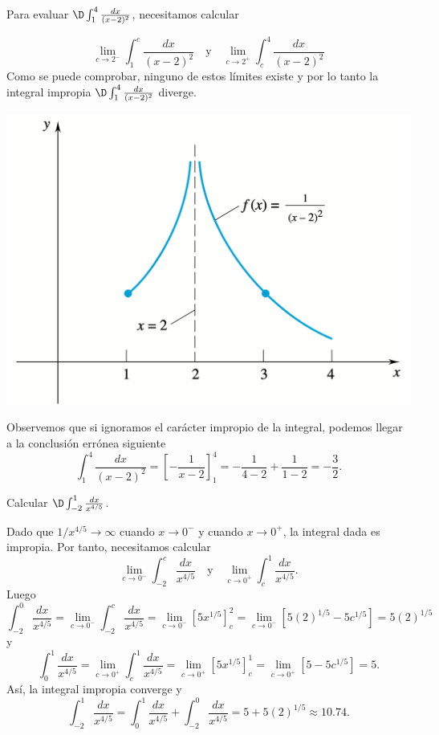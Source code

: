 \begin{example}
  Para evaluar
$\D\int_{1}^{4} \frac{dx}{(x-2)^2}$, 
necesitamos calcular

\noindent
\begin{minipage}{.6\textwidth}
  \[\lim_{c \to 2^{-}} \int_{1}^{c} \frac{dx}{(x-2)^2} \quad \text{y} \quad \lim_{c \to 2^{+}} \int_{c}^{4} \frac{dx}{(x-2)^2}\]
Como se puede comprobar, ninguno de estos límites existe y por lo tanto la integral impropia $\D\int_{1}^{4} \frac{dx}{(x-2)^2}$ diverge.
    
\end{minipage}
\begin{minipage}{.39\textwidth}
  \begin{center}
    \includegraphics[width=.9\textwidth]{pics/integral-impropia-discontinuidad-doble.png}
  \end{center}
\end{minipage}

Observemos que si ignoramos el carácter impropio de la integral, podemos llegar a la conclusión errónea siguiente
\[\int_{1}^{4} \frac{dx}{(x-2)^2} = \left[-\frac{1}{x-2}\right]_{1}^{4} =
-\frac{1}{4-2} +\frac{1}{1-2}=  -\frac{3}{2}.\]
\end{example}

\begin{example}
Calcular $\D\int_{-2}^{1} \frac{dx}{x^{4/5}}$.

Dado que $1/x^{4/5} \to \infty$ cuando $x \to 0^{-}$ y cuando $x \to 0^{+}$, la integral dada es impropia. Por tanto, necesitamos calcular
\[\lim_{c \to 0^{-}} \int_{-2}^{c} \frac{dx}{x^{4/5}} \quad \text{y} \quad \lim_{c \to 0^{+}} \int_{c}^{1} \frac{dx}{x^{4/5}}.\]
Luego
\[\int_{-2}^{0} \frac{dx}{x^{4/5}} = \lim_{c \to 0^{-}} \int_{-2}^{c} \frac{dx}{x^{4/5}} = \lim_{c \to 0^{-}} \left[5x^{1/5}\right]_{c}^{2} = \lim_{c \to 0^{-}} \left[5(2)^{1/5} - 5c^{1/5}\right] = 5(2)^{1/5}\]
y
\[
\int_{0}^{1} \frac{dx}{x^{4/5}} = \lim_{c \to 0^{+}} \int_{c}^{1} \frac{dx}{x^{4/5}} = \lim_{c \to 0^{+}} \left[5x^{1/5}\right]_{c}^{1} = \lim_{c \to 0^{+}} \left[5 - 5c^{1/5}\right] = 5.
\]
Así, la integral impropia converge y
\[
\int_{-2}^{1} \frac{dx}{x^{4/5}} 
= \int_{0}^{1} \frac{dx}{x^{4/5}} 
+
\int_{-2}^{0} \frac{dx}{x^{4/5}} 
= 5 + 5(2)^{1/5} \approx 10.74.
\]
\end{example}

